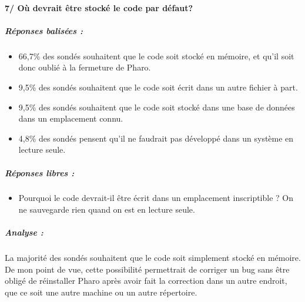 \paragraph{7/ Où devrait être stocké le code par défaut?}
\subparagraph{Réponses balisées :}
\begin{itemize}
	\item 66,7\% des sondés souhaitent que le code soit stocké en mémoire, et qu'il soit donc oublié à la fermeture de Pharo.
	\item 9,5\% des sondés souhaitent que le code soit écrit dans un autre fichier à part.
	\item 9,5\% des sondés souhaitent que le code soit stocké dans une base de données dans un emplacement connu.
	\item 4,8\% des sondés pensent qu'il ne faudrait pas développé dans un système en lecture seule.
\end{itemize}

\subparagraph{Réponses libres :}
\begin{itemize}
	\item Pourquoi le code devrait-il être écrit dans un emplacement inscriptible ? On ne sauvegarde rien quand on est en lecture seule.
\end{itemize}

\subparagraph{Analyse :}
La majorité des sondés souhaitent que le code soit simplement stocké en mémoire. De mon point de vue, cette possibilité permettrait de corriger un bug sans être obligé de réinstaller Pharo après avoir fait la correction dans un autre endroit, que ce soit une autre machine ou un autre répertoire.